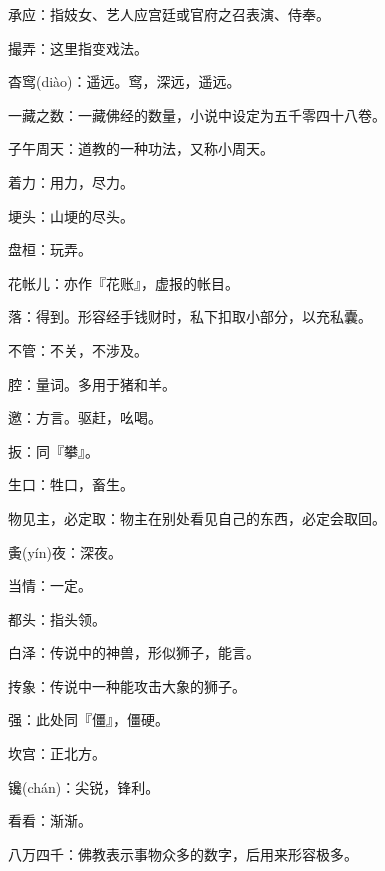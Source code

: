 \startbuffer[2301]
承应：指妓女、艺人应宫廷或官府之召表演、侍奉。
\stopbuffer


\startbuffer[2302]
撮弄：这里指变戏法。
\stopbuffer


\startbuffer[2303]
杳窎(diào)：遥远。窎，深远，遥远。
\stopbuffer


\startbuffer[2304]
一藏之数：一藏佛经的数量，小说中设定为五千零四十八卷。
\stopbuffer


\startbuffer[2305]
子午周天：道教的一种功法，又称小周天。
\stopbuffer


\startbuffer[2306]
着力：用力，尽力。
\stopbuffer


\startbuffer[2307]
埂头：山埂的尽头。
\stopbuffer


\startbuffer[2308]
盘桓：玩弄。
\stopbuffer


\startbuffer[2309]
花帐儿：亦作『花账』，虚报的帐目。
\stopbuffer


\startbuffer[2310]
落：得到。形容经手钱财时，私下扣取小部分，以充私囊。
\stopbuffer


\startbuffer[2311]
不管：不关，不涉及。
\stopbuffer


\startbuffer[2312]
腔：量词。多用于猪和羊。
\stopbuffer


\startbuffer[2313]
邀：方言。驱赶，吆喝。
\stopbuffer


\startbuffer[2314]
扳：同『攀』。
\stopbuffer


\startbuffer[2315]
生口：牲口，畜生。
\stopbuffer


\startbuffer[2316]
物见主，必定取：物主在别处看见自己的东西，必定会取回。
\stopbuffer


\startbuffer[2317]
夤(yín)夜：深夜。
\stopbuffer


\startbuffer[2318]
当情：一定。
\stopbuffer


\startbuffer[2319]
都头：指头领。
\stopbuffer


\startbuffer[2320]
白泽：传说中的神兽，形似狮子，能言。
\stopbuffer


\startbuffer[2321]
抟象：传说中一种能攻击大象的狮子。
\stopbuffer


\startbuffer[2322]
强：此处同『僵』，僵硬。
\stopbuffer


\startbuffer[2323]
坎宫：正北方。
\stopbuffer


\startbuffer[2324]
镵(chán)：尖锐，锋利。
\stopbuffer


\startbuffer[2325]
看看：渐渐。
\stopbuffer


\startbuffer[2326]
八万四千：佛教表示事物众多的数字，后用来形容极多。
\stopbuffer


